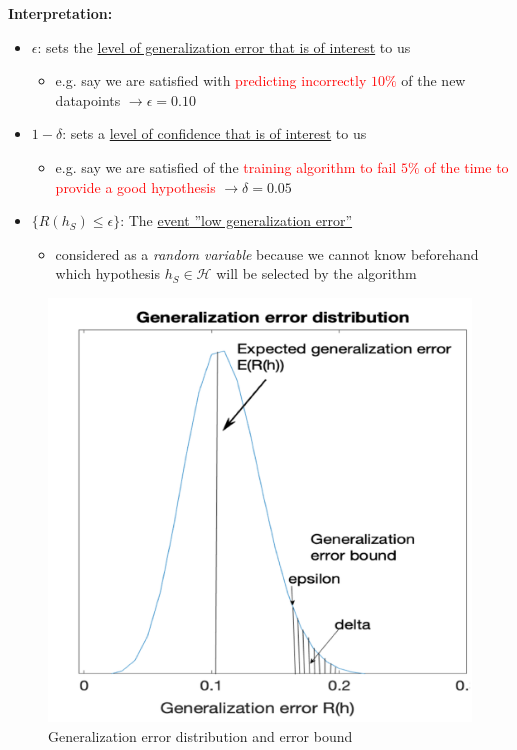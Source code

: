 \documentclass[12pt, a4paper]{article}
\begin{document}
\textbf{Interpretation:}
\begin{itemize}
  \item $\epsilon$: sets the \uline{level of generalization error that is of interest} to us
  \begin{itemize}
    \item e.g. say we are satisfied with \textcolor{Red}{predicting incorrectly $10\%$} of the new datapoints $\rightarrow \epsilon = 0.10$
  \end{itemize}
  \item $1-\delta$: sets a \uline{level of confidence that is of interest} to us
  \begin{itemize}
    \item e.g. say we are satisfied of the \textcolor{Red}{training algorithm to fail $5\%$ of the time to provide a good hypothesis} $\rightarrow \delta = 0.05$
  \end{itemize}
  \item $\{R(h_S ) \leq \epsilon\}$: The \uline{event ”low generalization error”}
  \begin{itemize}
    \item considered as a \textit{random variable} because we cannot know beforehand which hypothesis $h_S \in \mathcal{H}$ will be selected by the algorithm
  \end{itemize}
\end{itemize}

\begin{figure}[H]
  \centering  %
    \includegraphics[width=0.6\columnwidth]{images/generalization-error-distribution.png}
    \caption{Generalization error distribution and error bound}
    \label{fig:fig3}
\end{figure}
\end{document}
